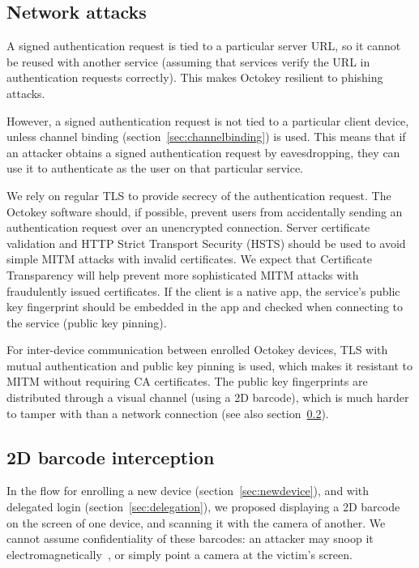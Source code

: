 \subsection{Network attacks}\label{sec:netattack}

A signed authentication request is tied to a particular server URL, so it cannot be reused with
another service (assuming that services verify the URL in authentication requests correctly). This
makes Octokey resilient to phishing attacks.

However, a signed authentication request is not tied to a particular client device, unless channel
binding (section~\ref{sec:channelbinding}) is used. This means that if an attacker obtains a signed
authentication request by eavesdropping, they can use it to authenticate as the user on that
particular service.

We rely on regular TLS to provide secrecy of the authentication request. The Octokey software
should, if possible, prevent users from accidentally sending an authentication request over an
unencrypted connection. Server certificate validation and HTTP Strict Transport Security (HSTS)
should be used to avoid simple MITM attacks with invalid certificates. We expect that Certificate
Transparency will help prevent more sophisticated MITM attacks with fraudulently issued
certificates. If the client is a native app, the service's public key fingerprint should be embedded
in the app and checked when connecting to the service (public key pinning).

For inter-device communication between enrolled Octokey devices, TLS with mutual authentication and
public key pinning is used, which makes it resistant to MITM without requiring CA certificates. The
public key fingerprints are distributed through a visual channel (using a 2D barcode), which is much
harder to tamper with than a network connection (see also section~\ref{sec:barcode-intercept}).

\subsection{2D barcode interception}\label{sec:barcode-intercept}

In the flow for enrolling a new device (section~\ref{sec:newdevice}), and with delegated login
(section~\ref{sec:delegation}), we proposed displaying a 2D barcode on the screen of one device, and
scanning it with the camera of another. We cannot assume confidentiality of these barcodes: an
attacker may snoop it electromagnetically~\cite{Kuhn05}, or simply point a camera at the victim's
screen.

